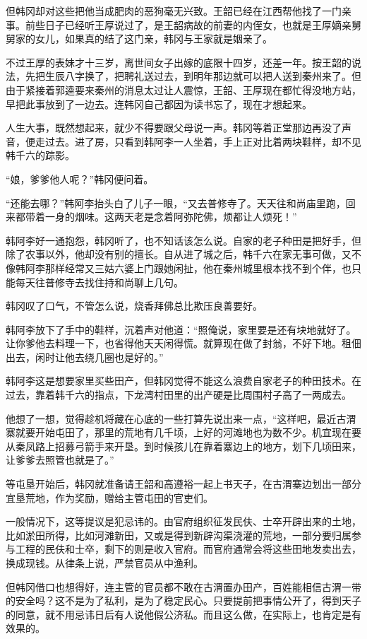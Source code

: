 但韩冈却对这些把他当成肥肉的恶狗毫无兴致。王韶已经在江西帮他找了一门亲事。前些日子已经听王厚说过了，是王韶病故的前妻的内侄女，也就是王厚嫡亲舅舅家的女儿，如果真的结了这门亲，韩冈与王家就是姻亲了。

不过王厚的表妹才十三岁，离世间女子出嫁的底限十四岁，还差一年。按王韶的说法，先把生辰八字换了，把聘礼送过去，到明年那边就可以把人送到秦州来了。但由于紧接着郭逵要来秦州的消息太过让人震惊，王韶、王厚现在都忙得没地方站，早把此事放到了一边去。连韩冈自己都因为读书忘了，现在才想起来。

人生大事，既然想起来，就少不得要跟父母说一声。韩冈等着正堂那边再没了声音，便走过去。进了房，只看到韩阿李一人坐着，手上正对比着两块鞋样，却不见韩千六的踪影。

“娘，爹爹他人呢？”韩冈便问着。

“还能去哪？”韩阿李抬头白了儿子一眼，“又去普修寺了。天天往和尚庙里跑，回来都带着一身的烟味。这两天老是念着阿弥陀佛，烦都让人烦死！”

韩阿李好一通抱怨，韩冈听了，也不知话该怎么说。自家的老子种田是把好手，但除了农事以外，他却没有别的擅长。自从进了城之后，韩千六在家无事可做，又不像韩阿李那样经常又三姑六婆上门跟她闲扯，他在秦州城里根本找不到个伴，也只能每天往普修寺去找住持和尚聊上几句。

韩冈叹了口气，不管怎么说，烧香拜佛总比欺压良善要好。

韩阿李放下了手中的鞋样，沉着声对他道：“照俺说，家里要是还有块地就好了。让你爹他去料理一下，也省得他天天闲得慌。就算现在做了封翁，不好下地。租佃出去，闲时让他去绕几圈也是好的。”

韩阿李这是想要家里买些田产，但韩冈觉得不能这么浪费自家老子的种田技术。在过去，靠着韩千六的指点，下龙湾村田里的出产硬是比周围村子高了一两成去。

他想了一想，觉得趁机将藏在心底的一些打算先说出来一点，“这样吧，最近古渭寨就要开始屯田了，那里的荒地有几千顷，上好的河滩地也为数不少。机宜现在要从秦凤路上招募弓箭手来开垦。到时候孩儿在靠着寨边上的地方，划下几顷田来，让爹爹去照管也就是了。”

等屯垦开始后，韩冈就准备请王韶和高遵裕一起上书天子，在古渭寨边划出一部分宜垦荒地，作为奖励，赠给主管屯田的官吏们。

一般情况下，这等提议是犯忌讳的。由官府组织征发民伕、士卒开辟出来的土地，比如淤田所得，比如河滩新田，又或是得到新辟沟渠浇灌的荒地，一部分要归属参与工程的民伕和士卒，剩下的则是收入官府。而官府通常会将这些田地发卖出去，换成现钱。从律条上说，严禁官员从中渔利。

但韩冈借口也想得好，连主管的官员都不敢在古渭置办田产，百姓能相信古渭一带的安全吗？这不是为了私利，是为了稳定民心。只要提前把事情公开了，得到天子的同意，就不用忌讳日后有人说他假公济私。而且这么做，在实际上，也肯定是有效果的。

